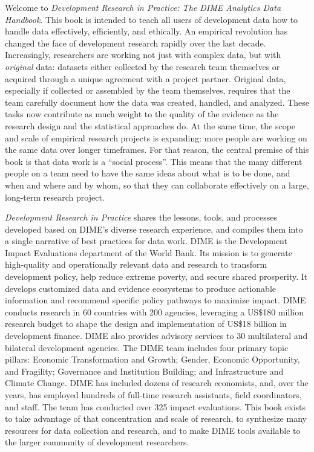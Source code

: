 \begin{fullwidth}
Welcome to \textit{Development Research in Practice: The DIME Analytics Data Handbook}.
This book is intended to teach all users of development data
how to handle data effectively, efficiently, and ethically.
An empirical revolution has changed the face of development research rapidly over the last decade.
Increasingly, researchers are working not just with complex data,
but with \textit{original} data:
datasets either collected by the research team themselves
or acquired through a unique agreement with a project partner.
Original data, especially if collected or assembled by the team themselves,
requires that the team carefully document how the data was created, handled, and analyzed.
These tasks now contribute as much weight to the quality of the evidence
as the research design and the statistical approaches do.
At the same time, the scope and scale of empirical research projects is expanding:
more people are working on the same data over longer timeframes.
For that reason, the central premise of this book is that data work is a ``social process''.
This means that the many different people on a team need to have the same ideas
about what is to be done, and when and where and by whom,
so that they can collaborate effectively on a large, long-term research project.

\textit{Development Research in Practice} shares the lessons, tools, 
and processes developed based on DIME's diverse research experience,
and compiles them into a single narrative of best practices for data work.
DIME is the Development Impact Evaluations department of the World Bank.
Its mission is to generate high-quality and operationally relevant data and research
to transform development policy, help reduce extreme poverty, and secure shared prosperity.
It develops customized data and evidence ecosystems to produce actionable information
and recommend specific policy pathways to maximize impact.
DIME conducts research in 60 countries with 200 agencies, leveraging a
US\$180 million research budget to shape the design and implementation of
US\$18 billion in development finance.
DIME also provides advisory services to 30 multilateral and bilateral development agencies.
The DIME team includes four primary topic pillars:
Economic Transformation and Growth;
Gender, Economic Opportunity, and Fragility;
Governance and Institution Building;
and Infrastructure and Climate Change.
DIME has included dozens of research economists,
and, over the years, has employed hundreds of full-time research assistants, field coordinators, and staff.
The team has conducted over 325 impact evaluations.
This book exists to take advantage of that concentration and scale of research,
to synthesize many resources for data collection and research,
and to make DIME tools available to the larger community of development researchers.


\end{fullwidth}
